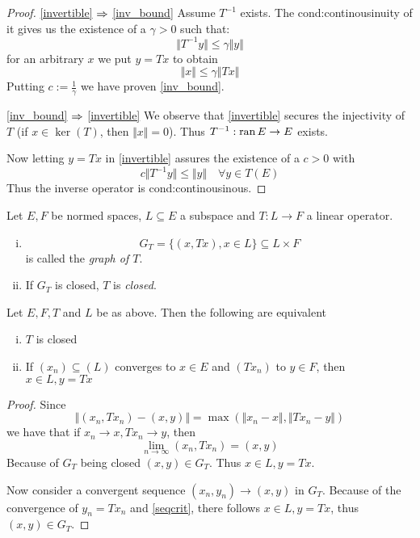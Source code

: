 \begin{proof}
 	 \eqref{invertible} $\Rightarrow$ \eqref{inv_bound} Assume $T^{-1}$ exists. The cond:continousinuity of it gives us the 
 	 existence of a $\gamma>0$ such that:
 	\[
 		\Vert T^{-1}y \Vert \leq \gamma \Vert y \Vert
 	\]
	for an arbitrary $x$ we put $y=Tx$ to obtain
	\[
		\Vert x \Vert \leq \gamma \Vert Tx\Vert
	\]
	Putting $c := \frac{1}{\gamma}$ we have proven \eqref{inv_bound}.
	
	\eqref{inv_bound} $\Rightarrow$ \eqref{invertible} We observe that \ref{invertible} secures the injectivity of $T$ (if $ x \in \ker(T)$, 		then $\Vert x \Vert =0$). Thus $T^{-1}: \operatorname{ran} E \to E$ exists.

	Now letting $y=Tx$ in \eqref{invertible} assures the existence of a $c>0$ with
	\[
		c\Vert T^{-1}y \Vert \leq \Vert y \Vert \quad \forall y \in T(E)
	\]
	Thus the inverse operator is cond:continousinous.
\end{proof}

\begin{definition}[Graph of $T$] \label{graph}
	Let $E,F$ be normed spaces, $L \subseteq E$ a subspace and $T: L \to F$ a linear operator. 
	\begin{enumerate}[(i)]
	\item
		\[
			G_T = \{(x,Tx) , x\in L \} \subseteq L \times F
		\]
		is called the \emph{graph of $T$}.
	
	\item If $G_T$ is closed, $T$ is \emph{closed}.
	\end{enumerate}
\end{definition}

\begin{lemma}
	Let $E,F,T$ and $L$ be as above. Then the following are equivalent
	\begin{enumerate}[(i)]
		\item{$T$ is closed \label{closed_graph}}
		\item{ If $(x_n) \subseteq(L)$ converges to $x \in E$ and $(Tx_n)$ to $y \in F$, then $x \in L, y=Tx$ \label{seqcrit}}
	\end{enumerate}
\end{lemma}

\begin{proof}
	Since
	\[
		\Vert (x_n, Tx_n) - (x,y) \Vert = \max(\Vert x_n - x \Vert, \Vert Tx_n -y \Vert )
	\]
	we have that if $x_n \to x, Tx_n \to y$, then
	\[
		\lim_{n \to \infty} (x_n, Tx_n) = (x,y)
	\]
	Because of $G_T$ being closed $(x,y) \in G_T$. Thus $x \in L, y=Tx$.

	Now consider a convergent sequence $(x_n, y_n) \to (x,y)$ in $G_T$. Because of the convergence of $y_n =Tx_n$ and  	
	\eqref{seqcrit}, there follows $x \in L, y=Tx$, thus $(x,y) \in G_T$.
\end{proof}

